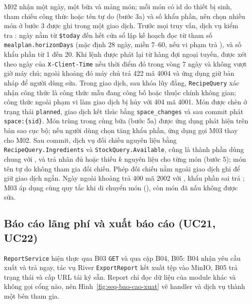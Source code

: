 
M02 nhận một ngày, một bữa và mảng món; mỗi món có id do thiết bị sinh, tham chiếu công thức hoặc tên tự do (bước 3a) và số khẩu phần, nên chọn nhiều món ở bước 3 được ghi trong một giao dịch. Trước mọi truy vấn, dịch vụ kiểm tra : ngày nằm từ \texttt{\$today} đến hết cửa sổ lập kế hoạch đọc từ tham số \texttt{mealplan.horizonDays} (mặc định 28 ngày, miền 7–60, nếu vi phạm trả ), và số khẩu phần từ 1 đến 20. Khi lệnh được phát lại từ hàng đợi ngoại tuyến,  được xét theo ngày của \texttt{X-Client-Time} nếu thời điểm đó trong vòng 7 ngày và không vượt giờ máy chủ; ngoài khoảng đó máy chủ trả 422 mã 4004 và ứng dụng giữ bản nháp để người dùng sửa. Trong giao dịch, sau khóa lũy đẳng, \texttt{RecipeQuery} xác nhận công thức là công thức mẫu đang công bố hoặc thuộc chính không gian; công thức ngoài phạm vi làm giao dịch bị hủy với 404 mã 4001. Món được chèn ở trạng thái \texttt{planned}, giao dịch kết thúc bằng \texttt{space\_changes} và sau commit phát \texttt{space:\{sid\}}. Món trùng trong cùng bữa (bước 5a) được ứng dụng phát hiện trên bản sao cục bộ; nếu người dùng chọn tăng khẩu phần, ứng dụng gọi M03 thay cho M02. Sau commit, dịch vụ đối chiếu nguyên liệu bằng \texttt{RecipeQuery.Ingredients} và \texttt{StockQuery.Available}, cũng là thành phần dùng chung với , và trả nhãn đủ hoặc thiếu $k$ nguyên liệu cho từng món (bước 5); món tên tự do không tham gia đối chiếu. Phép đối chiếu nằm ngoài giao dịch ghi để giữ giao dịch ngắn. Ngày ngoài khoảng trả 400 mã 2002 với , khẩu phần sai trả ; M03 áp dụng cùng quy tắc khi di chuyển món (), còn món đã nấu không được sửa.

\subsection{Báo cáo lãng phí và xuất báo cáo (UC21, UC22)}\label{sssec:ht-bao-cao}

\texttt{ReportService} hiện thực  qua B03 \texttt{GET}  và  qua cặp B04, B05: B04 nhận yêu cầu xuất và trả ngay, tác vụ River \texttt{ExportReport} kết xuất tệp vào MinIO, B05 trả trạng thái và cấp URL tải ký sẵn. Report chỉ đọc dữ liệu của module khác và không gọi cổng nào, nên Hình~\ref{fig:seq-bao-cao-xuat} vẽ handler và dịch vụ thành một bên tham gia.


